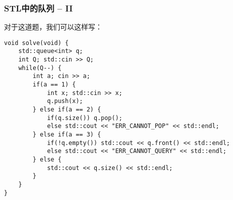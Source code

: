 \documentclass{beamer}
\begin{document}
\begin{frame}[fragile]
\frametitle{STL中的队列 -- II}
对于这道题，我们可以这样写：
\begin{onlyenv}
\begin{verbatim}
void solve(void) {
    std::queue<int> q;
    int Q; std::cin >> Q;
    while(Q--) {
        int a; cin >> a;
        if(a == 1) {
            int x; std::cin >> x;
            q.push(x);
        } else if(a == 2) {
            if(q.size()) q.pop();
            else std::cout << "ERR_CANNOT_POP" << std::endl;
        } else if(a == 3) {
            if(!q.empty()) std::cout << q.front() << std::endl;
            else std::cout << "ERR_CANNOT_QUERY" << std::endl;
        } else {
            std::cout << q.size() << std::endl;
        }
    }
}
\end{verbatim}
\end{onlyenv}
\end{frame}
\end{document}
